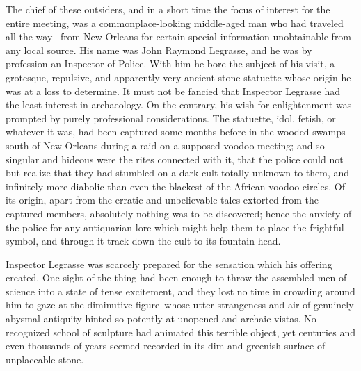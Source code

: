 The chief of these outsiders, and in a short time the focus of interest
for the entire meeting, was a commonplace-looking middle-aged man who
had traveled all the way \est\ from New Orleans for certain special
information unobtainable from any local source. His name was John
Raymond Legrasse, and he was by profession an Inspector of Police. With
him he bore the subject of his visit, a grotesque, repulsive, and
apparently very ancient stone statuette whose origin he was at a loss to
determine. It must not be fancied that Inspector Legrasse had the least
interest in archaeology. On the contrary, his wish for enlightenment was
prompted by purely professional considerations. The statuette, idol,
fetish, or whatever it was, had been captured some months before in the
wooded swamps south of New Orleans during a raid on a supposed voodoo
meeting; and so singular and hideous were the rites connected with it,
that the police could not but realize that they had stumbled on a dark
cult totally unknown to them, and infinitely more diabolic than even the
blackest of the African voodoo circles. Of its origin, apart from the
erratic and unbelievable tales extorted from the captured members,
absolutely nothing was to be discovered; hence the anxiety of the police
for any antiquarian lore which might help them to place the frightful
symbol, and through it track down the cult to its fountain-head.

Inspector Legrasse was scarcely prepared for the sensation which his
offering created. One sight of the thing had been enough to throw the
assembled men of science into a state of tense excitement, and they lost
no time in crowding around him to gaze at the diminutive figure\est\ whose
utter strangeness and air of genuinely abysmal antiquity hinted so
potently at unopened and archaic vistas. No recognized school of
sculpture had animated this terrible object, yet centuries and even
thousands of years seemed recorded in its dim and greenish surface of
unplaceable stone.

